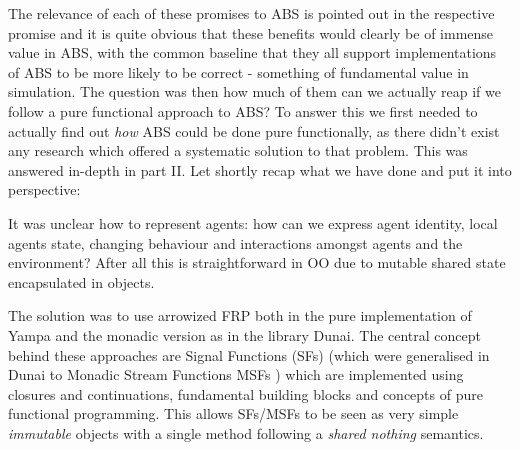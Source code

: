 The relevance of each of these promises to ABS is pointed out in the respective promise and it is quite obvious that these benefits would clearly be of immense value in ABS, with the common baseline that they all support implementations of ABS to be more likely to be correct - something of fundamental value in simulation. The question was then how much of them can we actually reap if we follow a pure functional approach to ABS? To answer this we first needed to actually find out \textit{how} ABS could be done pure functionally, as there didn't exist any research which offered a systematic solution to that problem. This was answered in-depth in part II. Let shortly recap what we have done and put it into perspective:

It was unclear how to represent agents: how can we express agent identity, local agents state, changing behaviour and interactions amongst agents and the environment? After all this is straightforward in OO due to mutable shared state encapsulated in objects.

The solution was to use arrowized FRP both in the pure implementation of Yampa and the monadic version as in the library Dunai. The central concept behind these approaches are Signal Functions (SFs) (which were generalised in Dunai to Monadic Stream Functions MSFs ) which are implemented using closures and continuations, fundamental building blocks and concepts of pure functional programming. This allows SFs/MSFs to be seen as very simple \textit{immutable} objects with a single method following a \textit{shared nothing} semantics. 






